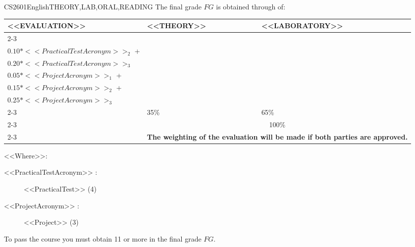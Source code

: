   \begin{evaluation}{CS2601}{English}{THEORY,LAB,ORAL,READING}
  The final grade $FG$ is obtained through of:
 
  \begin{tabularx}{0.9\textwidth}{|X|p{}|p{}|} \hline
    \multirow{4}{*}{\uppercase{<<Evaluation>>}} & \uppercase{<<Theory>>} & \uppercase{<<Laboratory>>} \\ \cline{2-3}
    & %
        \begin{minipage}{0.95\textwidth}
        \begin{tabular}{l}
            $0.05*<<PracticalTestAcronym>>_{1}$  + \\
            $0.10*<<PracticalTestAcronym>>_{2}$  + \\
            $0.20*<<PracticalTestAcronym>>_{3}$
        \end{tabular} 
        \end{minipage} 
    & %
        \begin{minipage}{0.95\textwidth}
        \begin{tabular}{l}
            $0.20*<<PracticalTestAcronym>>_{4}$  + \\
            $0.05*<<ProjectAcronym>>_{1}$  + \\
            $0.15*<<ProjectAcronym>>_{2}$  + \\
            $0.25*<<ProjectAcronym>>_{3}$
        \end{tabular} 
        \end{minipage}                 \\ \cline{2-3}
    
    & %
    35\% 
    & %
    65\% \\ \cline{2-3}
    & \multicolumn{2}{c|}{100\%}  \\ \cline{2-3}
    & \multicolumn{2}{c|}{\textbf{The weighting of the evaluation will be made if both parties are approved.}}  \\ \hline
    \end{tabularx}
      
    \vspace{2mm}
    \noindent <<Where>>:
    \begin{description}
        \item[<<PracticalTestAcronym>> :] <<PracticalTest>>  (4)
        \item[<<ProjectAcronym>> :] <<Project>> (3)
    \end{description}
 
  \noindent To pass the course you must obtain 11 or more in the final grade $FG$.
  \end{evaluation}

